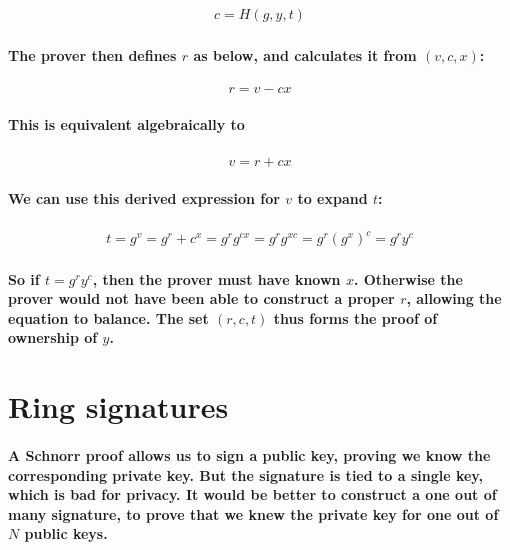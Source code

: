 \documentclass{article}
\begin{document}
\begin{eqnarray}
  c = H(g,y,t)
\end{eqnarray}

\paragraph{The prover then defines $r$ as below, and calculates it from $(v, c, x)$:}

\begin{eqnarray}
  r = v - cx
\end{eqnarray}
 
\paragraph{This is equivalent algebraically to}

\begin{eqnarray}
  v = r + cx
\end{eqnarray}

\paragraph{We can use this derived expression for $v$ to expand $t$:}

\begin{eqnarray}
  t = g^v= g^r + c^x = g^r g^{cx} = g^r g^{xc} = g^r (g^x)^c = g^r y^c
\end{eqnarray}

\paragraph{So if $t = g^r y^c$, then the prover must have known $x$.  Otherwise the prover would not have been able to construct a proper $r$, allowing the equation to balance.  The set $(r,c,t)$ thus forms the proof of ownership of $y$.}


\section{Ring signatures}

\paragraph{A Schnorr proof allows us to sign a public key, proving we know the corresponding private key.  But the signature is tied to a single key, which is bad for privacy.  It would be better to construct a one out of many signature, to prove that we knew the private key for one out of $N$ public keys.}
\end{document}
